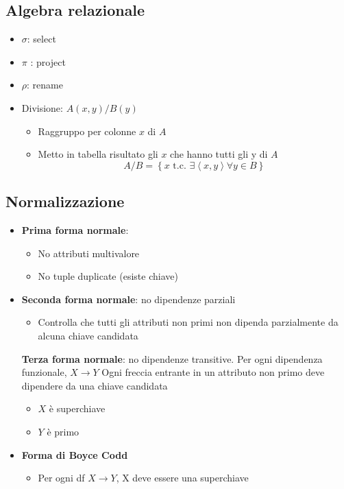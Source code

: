 \subsection{Algebra relazionale}
\begin{itemize}
	\item $ \sigma  $: select
	\item $ \pi  $ : project
	\item $ \rho  $: rename
	\item Divisione: $ A\left(x, y\right) / B\left(y\right) $
	      \begin{itemize}
		      \item Raggruppo per colonne $ x $ di $ A $
		      \item Metto in tabella risultato gli $ x $ che hanno tutti gli y di $ A $
		            \[
			            A / B = \left\{x \text{ t.c. } \exists \left<x,y\right> \forall y \in B \right\}
		            \]
	      \end{itemize}
\end{itemize}
\subsection{Normalizzazione}
\begin{itemize}
	\item \textbf{Prima forma normale}:
	      \begin{itemize}
		      \item No attributi multivalore
		      \item No tuple duplicate (esiste chiave)
	      \end{itemize}
	\item \textbf{Seconda forma normale}: no dipendenze parziali
	      \begin{itemize}
		      \item Controlla che tutti gli attributi non primi non dipenda parzialmente da alcuna chiave candidata
	      \end{itemize}
	      \textbf{Terza forma normale}: no dipendenze transitive. Per ogni dipendenza funzionale, $ X \rightarrow Y $
	      \vskip3mm
	      Ogni freccia entrante in un attributo non primo deve dipendere da una chiave candidata
	      \begin{itemize}
		      \item $ X $ è superchiave
		      \item $ Y $ è primo
	      \end{itemize}
	\item \textbf{Forma di Boyce Codd}
	      \begin{itemize}
		      \item Per ogni df $ X \rightarrow Y $, X deve essere una superchiave
	      \end{itemize}
\end{itemize}


